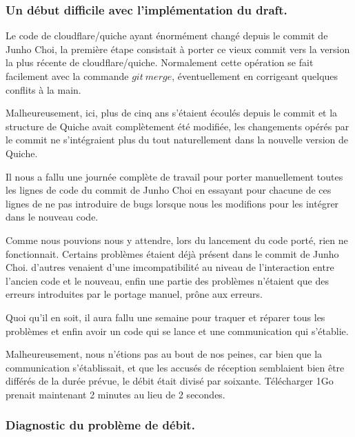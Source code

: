 \subsubsection{Un début difficile avec l'implémentation du draft.}

Le code de cloudflare/quiche ayant énormément changé depuis le commit de Junho Choi, la première étape consistait à porter ce vieux commit vers la version la plus récente de cloudflare/quiche.
Normalement cette opération se fait facilement avec la commande $git~merge$, éventuellement en corrigeant quelques conflits à la main.

Malheureusement, ici, plus de cinq ans s'étaient écoulés depuis le commit et la structure de Quiche avait complètement été modifiée, les changements opérés par le commit ne s'intégraient plus du tout naturellement dans la nouvelle version de Quiche.

Il nous a fallu une journée complète de travail pour porter manuellement toutes les lignes de code du commit de Junho Choi en essayant pour chacune de ces lignes de ne pas introduire de bugs lorsque nous les modifions pour les intégrer dans le nouveau code.

\vspace{0.5cm}

Comme nous pouvions nous y attendre, lors du lancement du code porté, rien ne fonctionnait. Certains problèmes étaient déjà présent dans le commit de Junho Choi. d'autres venaient d'une imcompatibilité au niveau de l'interaction entre l'ancien code et le nouveau, enfin une partie des problèmes n'étaient que des erreurs introduites par le portage manuel, prône aux erreurs.

\vspace{0.5cm}

Quoi qu'il en soit, il aura fallu une semaine pour traquer et réparer tous les problèmes et enfin avoir un code qui se lance et une communication qui s'établie.

\vspace{0.5cm}

Malheureusement, nous n'étions pas au bout de nos peines, car bien que la communication s'établissait, et que les accusés de réception semblaient bien être différés de la durée prévue, le débit était divisé par soixante. Télécharger 1Go prenait maintenant 2 minutes au lieu de 2 secondes.

\subsubsection{Diagnostic du problème de débit.}

